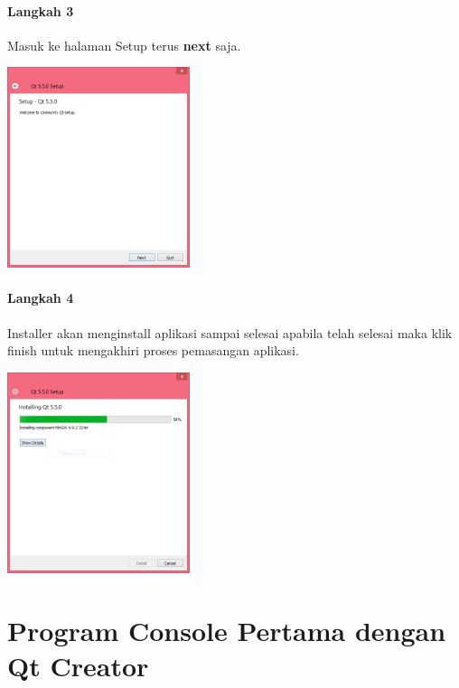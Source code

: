   
\paragraph{Langkah 3}
  Masuk ke halaman Setup terus \textbf{next} saja.

  
\begin{center}
	 \includegraphics[width=0.4\textwidth]{images/install-qt-3.png}
\end{center}
 


  
\paragraph{Langkah 4}
  Installer akan menginstall aplikasi sampai selesai apabila telah
  selesai maka klik finish untuk mengakhiri proses pemasangan aplikasi.


  


\begin{center}

	\includegraphics[width=0.4\textwidth]{images/install-qt-4.png}
\end{center}

\section{Program Console Pertama dengan Qt
Creator}\label{program-console-pertama-dengan-qt-creator}



